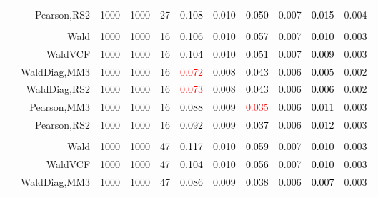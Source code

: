 \documentclass[
]{article}
\begin{document}
\begin{table}[H]
{\begin{tabular}[t]{lrrrrrrrlrr}
\hspace{1em} & Pearson,RS2 & 1000 & 1000 & 27 & \textcolor{black}{0.108} & 0.010 & \textcolor{black}{0.050} & 0.007 & \textcolor{black}{0.015} & 0.004\\
\cmidrule{1-11}
\addlinespace[0.3em]
\multicolumn{11}{l}{\textbf{2F 10V}}\\
\hspace{1em} & Wald & 1000 & 1000 & 16 & \textcolor{black}{0.106} & 0.010 & \textcolor{black}{0.057} & 0.007 & \textcolor{black}{0.010} & 0.003\\

\hspace{1em} & WaldVCF & 1000 & 1000 & 16 & \textcolor{black}{0.104} & 0.010 & \textcolor{black}{0.051} & 0.007 & \textcolor{black}{0.009} & 0.003\\

\hspace{1em} & WaldDiag,MM3 & 1000 & 1000 & 16 & \textcolor{red}{0.072} & 0.008 & \textcolor{black}{0.043} & 0.006 & \textcolor{black}{0.005} & 0.002\\

\hspace{1em} & WaldDiag,RS2 & 1000 & 1000 & 16 & \textcolor{red}{0.073} & 0.008 & \textcolor{black}{0.043} & 0.006 & \textcolor{black}{0.006} & 0.002\\

\hspace{1em} & Pearson,MM3 & 1000 & 1000 & 16 & \textcolor{black}{0.088} & 0.009 & \textcolor{red}{0.035} & 0.006 & \textcolor{black}{0.011} & 0.003\\

\hspace{1em} & Pearson,RS2 & 1000 & 1000 & 16 & \textcolor{black}{0.092} & 0.009 & \textcolor{black}{0.037} & 0.006 & \textcolor{black}{0.012} & 0.003\\
\cmidrule{1-11}
\addlinespace[0.3em]
\multicolumn{11}{l}{\textbf{3F 15V}}\\
\hspace{1em} & Wald & 1000 & 1000 & 47 & \textcolor{black}{0.117} & 0.010 & \textcolor{black}{0.059} & 0.007 & \textcolor{black}{0.010} & 0.003\\

\hspace{1em} & WaldVCF & 1000 & 1000 & 47 & \textcolor{black}{0.104} & 0.010 & \textcolor{black}{0.056} & 0.007 & \textcolor{black}{0.010} & 0.003\\

\hspace{1em} & WaldDiag,MM3 & 1000 & 1000 & 47 & \textcolor{black}{0.086} & 0.009 & \textcolor{black}{0.038} & 0.006 & \textcolor{black}{0.007} & 0.003\\


\end{tabular}}
\end{table}
\end{document}
